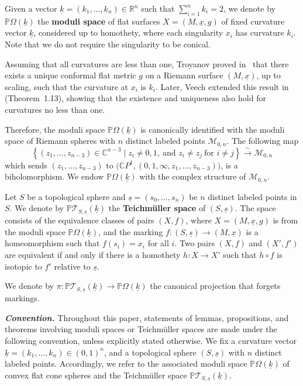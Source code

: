 \documentclass{compositio}
\numberwithin{equation}{section}
\numberwithin{figure}{section}
\theoremstyle{definition}
\theoremstyle{plain}
\begin{document}
{Given a vector $\underline{k} = (k_1, \ldots, k_n) \in \mathbb{R}^n$ such that $\sum_{i=1}^{n} k_i = 2$, we denote by $\mathbb{P}\Omega(\underline{k})$ the \textbf{moduli space} of flat surfaces $X= (M, \underline{x}, g)$ of fixed curvature vector $\underline{k}$, considered up to homothety, where each singularity $x_i$ has curvature $k_i$. Note that we do not require the singularity to be conical.

Assuming that all curvatures are less than one, Troyanov proved in~\cite{Tro1986} that there exists a unique conformal flat metric $g$ on a Riemann surface $(M, \underline{x})$, up to scaling, such that the curvature at $x_i$ is $k_i$. Later, Veech extended this result in~\cite{Veech1993} (Theorem~1.13), showing that the existence and uniqueness also hold for curvatures no less than one.

Therefore, the moduli space $\mathbb{P}\Omega(\underline{k})$ is canonically identified with the moduli space of Riemann spheres with $n$ distinct labeled points $\mathcal{M}_{0,n}$. The following map
$$
\left\{(z_1,\ldots,z_{n-3})\in \mathbb{C}^{n-3} \mid z_i\ne 0, 1,\ \text{and } z_i\ne z_j\ \text{for } i\ne j \right\} \overset{\sim}{\rightarrow} \mathcal{M}_{0,n}
$$
which sends $(z_1,\ldots,z_{n-3})$ to $\big(\mathbb{C}P^1,(0,1,\infty,z_1,\ldots,z_{n-3})\big)$, is a biholomorphism.
We endow $\mathbb{P}\Omega(\underline{k})$ with the complex structure of $\mathcal{M}_{0,n}$.

Let $S$ be a topological sphere and $\underline{s} = (s_0, \ldots, s_n)$ be $n$ distinct labeled points in $S$. We denote by $\mathbb{P}\mathcal{T}_{S, \underline{s}}(\underline{k})$ the \textbf{Teichm\"uller space} of $(S, \underline{s})$. The space consists of the equivalence classes of pairs $(X,f)$, where $X = (M, \underline{x}, g)$ is from the moduli space $\mathbb{P}\Omega(\underline{k})$, and the marking $f:(S,\underline{s}) \to (M, \underline{x})$ is a homeomorphism such that $f(s_i) = x_i$ for all $i$. Two pairs $(X,f)$ and $(X', f')$ are equivalent if and only if there is a homothety $h:X\to X'$ such that $h\circ f$ is isotopic to $f'$ relative to $\underline{s}$.

We denote by $\pi: \mathbb{P}\mathcal{T}_{S, \underline{s}}(\underline{k})\to \mathbb{P}\Omega(\underline{k})$ the canonical projection that forgets markings.\newline

\noindent\textit{\textbf{Convention.}} Throughout this paper, statements of lemmas, propositions, and theorems involving moduli spaces or Teichm\"uller spaces are made under the following convention, unless explicitly stated otherwise. We fix a curvature vector $\underline{k} = (k_1, \ldots, k_n) \in (0,1)^n$, and a topological sphere $(S, \underline{s})$ with $n$ distinct labeled points. Accordingly, we refer to the associated moduli space $\mathbb{P}\Omega(\underline{k})$ of convex flat cone spheres and the Teichm\"uller space $\mathbb{P}\mathcal{T}_{S, \underline{s}}(\underline{k})$.


}
\end{document}
